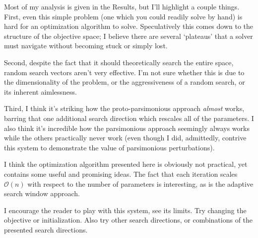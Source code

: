 \documentclass{article}
\begin{document}
Most of my analysis is given in the Results, but I'll highlight a couple things.  First, even this simple problem (one which you could readily solve by hand) is hard for an optimization algorithm to solve.  Speculatively this comes down to the structure of the objective space; I believe there are several `plateaus' that a solver must navigate without becoming stuck or simply lost.

Second, despite the fact that it should theoretically search the entire space, random search vectors aren't very effective.  I'm not sure whether this is due to the dimensionality of the problem, or the aggressiveness of a random search, or its inherent aimlessness.

Third, I think it's striking how the proto-parsimonious approach \textit{almost} works, barring that one additional search direction which rescales all of the parameters.  I also think it's incredible how the parsimonious approach seemingly always works while the others practically never work (even though I did, admittedly, contrive this system to demonstrate the value of parsimonious perturbations).

I think the optimization algorithm presented here is obviously not practical, yet contains some useful and promising ideas.  The fact that each iteration scales \(\mathcal{O}\left(n\right)\) with respect to the number of parameters is interesting, as is the adaptive search window approach.

I encourage the reader to play with this system, see its limits.  Try changing the objective or initialization.  Also try other search directions, or combinations of the presented search directions.
\end{document}
